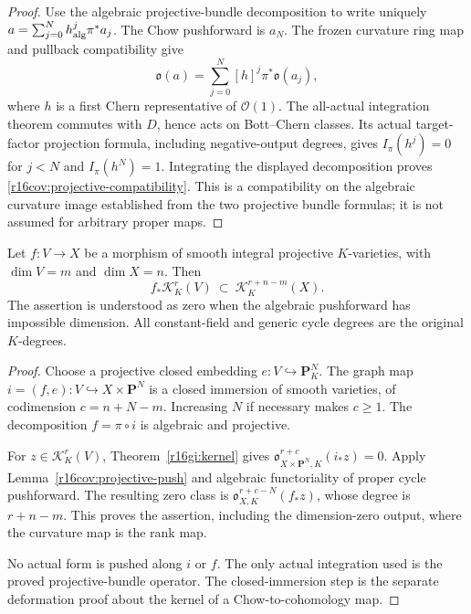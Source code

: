 \begin{proof}
Use the algebraic projective-bundle decomposition to write uniquely
$a=\sum_{j=0}^N h_{\rm alg}^j\pi^*a_j$.
The Chow pushforward is $a_N$.  The frozen curvature ring map and
pullback compatibility give
\[
 \mathfrak o(a)=\sum_{j=0}^N[h]^j\pi^*\mathfrak o(a_j),
\]
where $h$ is a first Chern representative of $\mathcal O(1)$.
The all-actual integration theorem commutes with $D$, hence acts on
Bott--Chern classes.  Its actual target-factor projection formula,
including negative-output degrees, gives $I_\pi(h^j)=0$ for $j<N$
and $I_\pi(h^N)=1$.  Integrating the displayed decomposition proves
\eqref{r16cov:projective-compatibility}.  This is a compatibility on
the algebraic curvature image established from the two projective
bundle formulas; it is not assumed for arbitrary proper maps.
\end{proof}

\begin{theorem}
\label{r16cov:proper-push}
Let $f:V\to X$ be a morphism of smooth integral projective
$K$-varieties, with $\dim V=m$ and $\dim X=n$.  Then
\[
 f_*\mathcal K_K^r(V)\ \subset\
          \mathcal K_K^{r+n-m}(X).
 \tag{CV16.3}\label{r16cov:proper-kernel}
\]
The assertion is understood as zero when the algebraic pushforward
has impossible dimension.  All constant-field and generic cycle
degrees are the original $K$-degrees.
\end{theorem}

\begin{proof}
Choose a projective closed embedding $e:V\hookrightarrow\mathbf P^N_K$.
The graph map $i=(f,e):V\hookrightarrow X\times\mathbf P^N$ is a
closed immersion of smooth varieties, of codimension $c=n+N-m$.
Increasing $N$ if necessary makes $c\geq1$.  The decomposition
$f=\pi\circ i$ is algebraic and projective.

For $z\in\mathcal K_K^r(V)$,
Theorem~\ref{r16gi:kernel} gives
$\mathfrak o_{X\times\mathbf P^N,K}^{r+c}(i_*z)=0$.
Apply Lemma~\ref{r16cov:projective-push} and algebraic functoriality
of proper cycle pushforward.  The resulting zero class is
$\mathfrak o_{X,K}^{r+c-N}(f_*z)$, whose degree is
$r+n-m$.  This proves the assertion, including the dimension-zero
output, where the curvature map is the rank map.

No actual form is pushed along $i$ or $f$.  The only actual
integration used is the proved projective-bundle operator.  The
closed-immersion step is the separate deformation proof about the
kernel of a Chow-to-cohomology map.
\end{proof}


